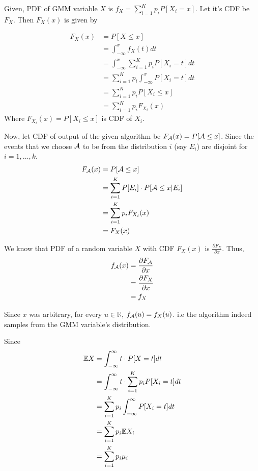\begin{solution}


	Given, PDF of GMM variable $X$ is $f_X = \sum_{i=1}^K p_iP[X_i=x]$. Let
	it's CDF be $F_X$. Then $F_X(x)$ is given by

	\begin{align}
		F_X(x) & = P[X\leq x]                                    \\
		       & = \int_{-\infty}^{x} f_X(t)dt                   \\
		       & = \int_{-\infty}^{x} \sum_{i=1}^K p_iP[X_i=t]dt \\
		       & = \sum_{i=1}^K p_i\int_{-\infty}^{x} P[X_i=t]dt \\
		       & = \sum_{i=1}^K p_iP[X_i\leq x]                  \\
		       & = \sum_{i=1}^K p_iF_{X_i}(x)
	\end{align}
	Where $F_{X_i}(x) = P[X_i\leq x]$ is CDF of $X_i$.

	Now, let CDF of output of the given algorithm be
	$F_{\mathcal{A}}(x) = P[\mathcal{A}\leq x]$. Since the events that we choose $\mathcal{A}$ to be
	from the distribution $i$ (say $E_i$) are disjoint for $i=1,\dots,k$.
	\begin{align}
		F_{\mathcal{A}}(x) & = P[\mathcal{A}\leq x]                                \\
		        & = \sum_{i=1}^K P[E_i]\cdot P[\mathcal{A}\leq x | E_i] \\
		        & = \sum_{i=1}^K p_iF_{X_i}(x)                 \\
		        & = F_X(x)
	\end{align}

	We know that PDF of a random variable $X$ with CDF $F_X(x)$ is
	$\frac{\partial F_X}{\partial x}$. Thus,
	\begin{align}
		f_{\mathcal{A}}(x) & = \frac{\partial F_{\mathcal{A}}}{\partial x} \\
		        & = \frac{\partial F_X}{\partial x}  \\
		        & = f_X
	\end{align}

	Since $x$ was arbitrary, for every $u\in\mathbb{R}$, $f_{\mathcal{A}}(u) =
		f_X(u)$. i.e the algorithm indeed samples from the GMM variable's
	distribution.



	Since
	\begin{align}
		\mathbb{E}{X} & = \int_{-\infty}^{\infty} t\cdot P[X=t]dt                    \\
		      & = \int_{-\infty}^{\infty} t\cdot \sum_{i=1}^K p_iP[X_i=t] dt \\
		      & = \sum_{i=1}^K p_i \int_{-\infty}^{\infty} P[X_i = t] dt     \\
		      & = \sum_{i=1}^K p_i \mathbb{E}{X_i}                                   \\
		      & = \sum_{i=1}^K p_i\mu_i
	\end{align}
\end{solution}
